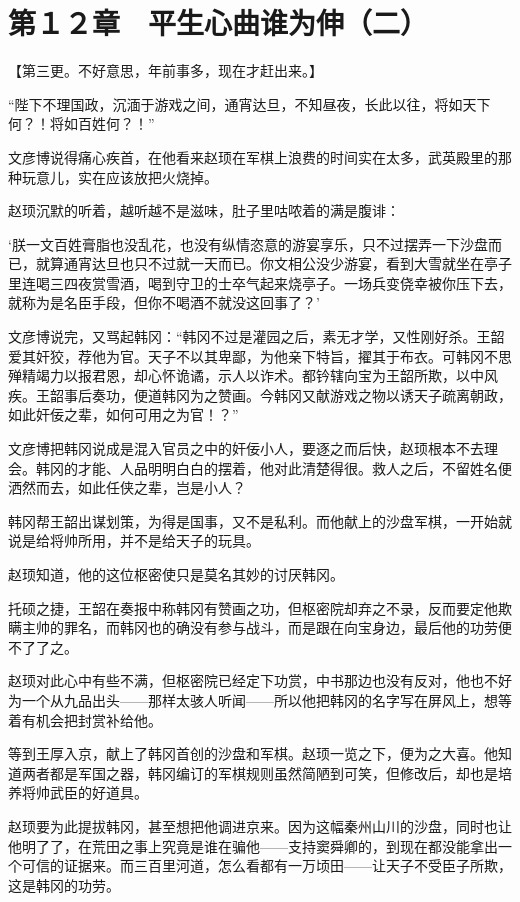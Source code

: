\section{第１２章　平生心曲谁为伸（二）}

【第三更。不好意思，年前事多，现在才赶出来。】

“陛下不理国政，沉湎于游戏之间，通宵达旦，不知昼夜，长此以往，将如天下何？！将如百姓何？！”

文彦博说得痛心疾首，在他看来赵顼在军棋上浪费的时间实在太多，武英殿里的那种玩意儿，实在应该放把火烧掉。

赵顼沉默的听着，越听越不是滋味，肚子里咕哝着的满是腹诽：

‘朕一文百姓膏脂也没乱花，也没有纵情恣意的游宴享乐，只不过摆弄一下沙盘而已，就算通宵达旦也只不过就一天而已。你文相公没少游宴，看到大雪就坐在亭子里连喝三四夜赏雪酒，喝到守卫的士卒气起来烧亭子。一场兵变侥幸被你压下去，就称为是名臣手段，但你不喝酒不就没这回事了？’

文彦博说完，又骂起韩冈：“韩冈不过是灌园之后，素无才学，又性刚好杀。王韶爱其奸狡，荐他为官。天子不以其卑鄙，为他亲下特旨，擢其于布衣。可韩冈不思殚精竭力以报君恩，却心怀诡谲，示人以诈术。都钤辖向宝为王韶所欺，以中风疾。王韶事后奏功，便道韩冈为之赞画。今韩冈又献游戏之物以诱天子疏离朝政，如此奸佞之辈，如何可用之为官！？”

文彦博把韩冈说成是混入官员之中的奸佞小人，要逐之而后快，赵顼根本不去理会。韩冈的才能、人品明明白白的摆着，他对此清楚得很。救人之后，不留姓名便洒然而去，如此任侠之辈，岂是小人？

韩冈帮王韶出谋划策，为得是国事，又不是私利。而他献上的沙盘军棋，一开始就说是给将帅所用，并不是给天子的玩具。

赵顼知道，他的这位枢密使只是莫名其妙的讨厌韩冈。

托硕之捷，王韶在奏报中称韩冈有赞画之功，但枢密院却弃之不录，反而要定他欺瞒主帅的罪名，而韩冈也的确没有参与战斗，而是跟在向宝身边，最后他的功劳便不了了之。

赵顼对此心中有些不满，但枢密院已经定下功赏，中书那边也没有反对，他也不好为一个从九品出头——那样太骇人听闻——所以他把韩冈的名字写在屏风上，想等着有机会把封赏补给他。

等到王厚入京，献上了韩冈首创的沙盘和军棋。赵顼一览之下，便为之大喜。他知道两者都是军国之器，韩冈编订的军棋规则虽然简陋到可笑，但修改后，却也是培养将帅武臣的好道具。

赵顼要为此提拔韩冈，甚至想把他调进京来。因为这幅秦州山川的沙盘，同时也让他明了了，在荒田之事上究竟是谁在骗他——支持窦舜卿的，到现在都没能拿出一个可信的证据来。而三百里河道，怎么看都有一万顷田——让天子不受臣子所欺，这是韩冈的功劳。


